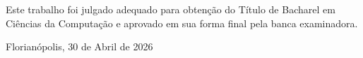 \documentclass[
  12pt,
  oneside,
  a4paper,
  chapter=TITLE,
  section=TITLE,
  english,
  brazil
]{abntex2}
\begin{document}
\frenchspacing
\OnehalfSpacing


\imprimircapa

\imprimirfolhaderosto

\begin{folhadeaprovacao}
  \begin{center}
    {\ABNTEXchapterfont\large\imprimirautor}
    \vspace*{\fill}\vspace*{\fill}
    \begin{center}
      \ABNTEXchapterfont\bfseries\Large\imprimirtitulo
    \end{center}
    \vspace*{\fill}
    \hspace{.45\textwidth}
    \begin{minipage}{.5\textwidth}
        \imprimirpreambulo
    \end{minipage}%
    \vspace*{\fill}
   \end{center}
   \begin{center}
   Este trabalho foi julgado adequado para obtenção do Título de Bacharel em
   Ciências da Computação e aprovado em sua forma final pela banca examinadora.
   \end{center}
   \vspace*{\fill}
   \begin{center}
     Florianópolis, 30 de Abril de 2026
   \end{center}
\end{folhadeaprovacao}
\end{document}
